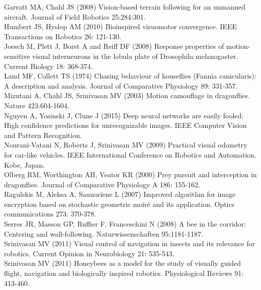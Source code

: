 \documentclass[12pt,letter]{article}
\begin{document}
Garratt MA, Chahl JS (2008) Vision-based terrain following for an unmanned aircraft. Journal of Field Robotics  25:284:301. \\

Humbert JS, Hyslop AM (2010) Bioinspired visuomotor convergence. IEEE Transactions on Robotics  26: 121-130.\\

Joesch M, Plett J, Borst A and Reiff DF (2008) Response properties of motion-sensitive visual interneurons in the lobula plate of Drosophila melanogaster. Current Biology  18: 368-374.\\

Land MF, Collett TS (1974) Chasing behaviour of houseflies (Fannia canicularis): A description and analysis. Journal of Comparative Physiology  89: 331-357.\\

Mizutani A, Chahl JS, Srinivasan MV (2003) Motion camouflage in dragonflies. Nature  423:604-1604.\\

Nguyen A, Yosinski J, Clune J (2015) Deep neural networks are easily fooled: High confidence predictions for unrecognizable images. IEEE Computer Vision and Pattern Recognition.\\

Nourani-Vatani N, Roberts J, Srinivasan MV (2009) Practical visual odometry for car-like vehicles. IEEE International Conference on Robotics and Automation. Kobe, Japan. \\

Olberg RM, Worthington AH, Veator KR (2000) Prey pursuit and interception in dragonflies. Journal of Comparative Physiology A  186: 155-162.\\

Ragulskis M, Aleksa A, Saunoriene L (2007) Improved algorithm for image encryption based on stochastic geometric moiré and its application. Optics communications   273: 370-378.\\

Serres JR, Masson GP, Ruffier F, Franceschini N (2008) A bee in the corridor: Centering and wall-following. Naturwissenschaften  95:1181-1187. \\

Srinivasan MV (2011) Visual control of navigation in insects and its relevance for robotics. Current Opinion in Neurobiology  21: 535-543. \\ 

Srinivasan MV (2011) Honeybees as a model for the study of visually guided flight, navigation and biologically inspired robotics. Physiological Reviews  91: 413-460. \\
\end{document}
